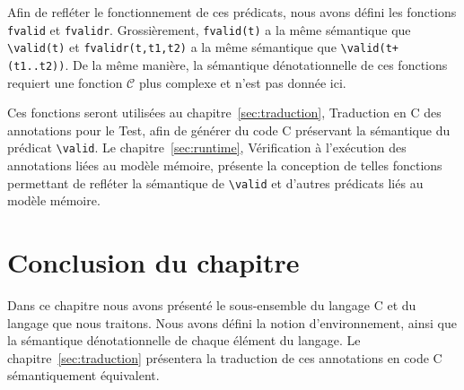 Afin de refléter le fonctionnement de ces prédicats, nous avons défini les
fonctions \lstinline'fvalid' et \lstinline'fvalidr'.
Grossièrement, \lstinline'fvalid(t)' a la même sémantique que
\lstinline'\valid(t)' et \lstinline'fvalidr(t,t1,t2)' a la même sémantique que
\lstinline'\valid(t+(t1..t2))'.
De la même manière, la sémantique dénotationnelle de ces fonctions requiert une
fonction $\mathcal{C}$ plus complexe et n'est pas donnée ici.

Ces fonctions seront utilisées au chapitre~\ref{sec:traduction}, Traduction en
C des annotations pour le Test, afin de générer du code C préservant la
sémantique du prédicat \lstinline'\valid'.
Le chapitre~\ref{sec:runtime}, Vérification à l'exécution des annotations liées
au modèle mémoire, présente la conception de telles fonctions permettant de
refléter la sémantique de \lstinline'\valid' et d'autres prédicats \eacsl liés
au modèle mémoire.


\section*{Conclusion du chapitre}

Dans ce chapitre nous avons présenté le sous-ensemble du langage C et du
langage \eacsl que nous traitons.
Nous avons défini la notion d'environnement, ainsi que la sémantique
dénotationnelle de chaque élément du langage.
Le chapitre~\ref{sec:traduction} présentera la traduction de ces annotations
\eacsl en code C sémantiquement équivalent.
